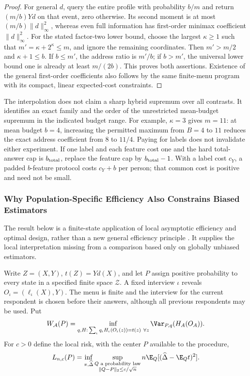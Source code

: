 \begin{proof}
For general $d$, query the entire profile with probability $b/m$ and return
$(m/b)Yd$ on that event, zero otherwise. Its second moment is at most
$(m/b)\|d\|_\infty^2$, whereas even full information has first-order minimax
coefficient $\|d\|_\infty^2$. For the stated factor-two lower bound, choose
the largest $\kappa\ge1$ such that $m'=\kappa+2^\kappa\le m$, and ignore the remaining
coordinates. Then $m'>m/2$ and $\kappa+1\le b$. If $b\le m'$, the address ratio
is $m'/b$; if $b>m'$, the universal lower bound one is already at least
$m/(2b)$. This proves both assertions. Existence of the general
first-order coefficients also follows by the same finite-menu program with
its compact, linear expected-cost constraints.
\end{proof}

The interpolation does not claim a sharp hybrid supremum over all contrasts.
It identifies an exact family and the order of the unrestricted mean-budget
supremum in the indicated budget range. For example, $\kappa=3$ gives $m=11$:
at mean budget $b=4$, increasing the permitted maximum from $B=4$ to $11$
reduces the exact address coefficient from $8$ to $11/4$. Paying for labels
does not invalidate either experiment. If one label and each feature cost
one and the hard total-answer cap is $b_{\rm total}$, replace the feature
cap by $b_{\rm total}-1$. With a label cost $c_Y$, a padded $b$-feature
protocol costs $c_Y+b$ per person; that common cost is positive and need not
be small.

\subsubsection{Why Population-Specific Efficiency Also Constrains Biased Estimators}
\label{app:localminimax}
The result below is a finite-state application of local asymptotic efficiency
and optimal design, rather than a new general efficiency principle
\citep{robins1994,tsiatis2006,hahn2011,barnes2020}. It supplies the local
interpretation missing from a comparison based only on globally unbiased
estimators.

Write $Z=(X,Y)$, $t(Z)=Yd(X)$, and let $P$ assign positive probability to
every state in a specified finite space $\mathcal Z$. A fixed interview
$\iota$ reveals $O_\iota=(\ell_\iota(X),Y)$. The menu is finite and the interview for
the current respondent is chosen before their answers, although all previous
respondents may be used. Put
\[
 W_{\mathcal A}(P)=\inf_{q,H:\,\sum_\iota q_\iota H_\iota(O_\iota(z))=t(z)\ \forall z}
                      \Var_{P,q}(H_A(O_A)).
\]
For $c>0$ define the local risk, with the center $P$ available to the procedure,
\[
 L_{n,c}(P)=\inf_{\pi,\widehat\Delta}
       \sup_{\substack{Q\text{ a probability law}\\
                        \|Q-P\|_2\le c/\sqrt n}}
       n\E_Q[(\widehat\Delta-\E_Qt)^2].
\]

